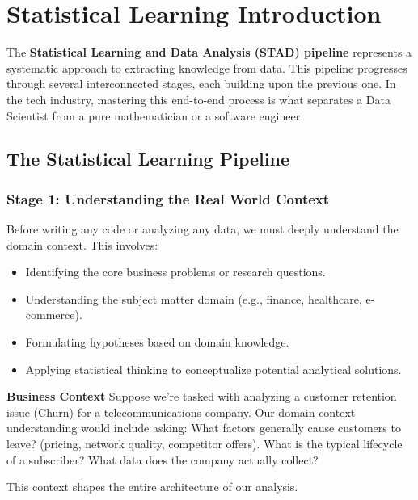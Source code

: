 \section{Statistical Learning Introduction}


The \textbf{Statistical Learning and Data Analysis (STAD) pipeline} represents a systematic approach to extracting knowledge from data. This pipeline progresses through several interconnected stages, each building upon the previous one. In the tech industry, mastering this end-to-end process is what separates a Data Scientist from a pure mathematician or a software engineer.

\subsection{The Statistical Learning Pipeline}

\subsubsection{Stage 1: Understanding the Real World Context}

Before writing any code or analyzing any data, we must deeply understand the domain context. This involves:

\begin{itemize}
    \item Identifying the core business problems or research questions.
    \item Understanding the subject matter domain (e.g., finance, healthcare, e-commerce).
    \item Formulating hypotheses based on domain knowledge.
    \item Applying statistical thinking to conceptualize potential analytical solutions.
\end{itemize}

\vspace{0.15cm}
\begin{example}{\textbf{Business Context}}
Suppose we're tasked with analyzing a customer retention issue (Churn) for a telecommunications company. Our domain context understanding would include asking: What factors generally cause customers to leave? (pricing, network quality, competitor offers). What is the typical lifecycle of a subscriber? What data does the company actually collect? 

This context shapes the entire architecture of our analysis.
\end{example}

